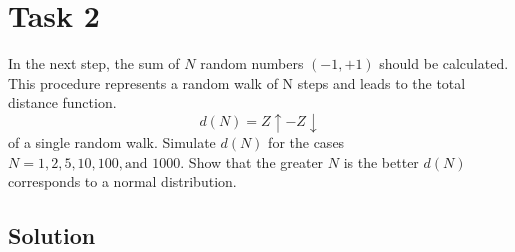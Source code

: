 \section*{Task 2}
In the next step, the sum of $N$ random numbers $(-1,+1)$ should be calculated. This procedure represents a random walk of N steps and leads to the total distance function.
\begin{equation}
    d(N) = Z\uparrow - Z \downarrow
\end{equation}
of a single random walk. Simulate $d(N)$ for the cases $N = 1, 2, 5, 10, 100, \text{and }1000$. Show that the greater $N$ is the better $d(N)$ corresponds to a normal distribution.

\subsection*{Solution}


